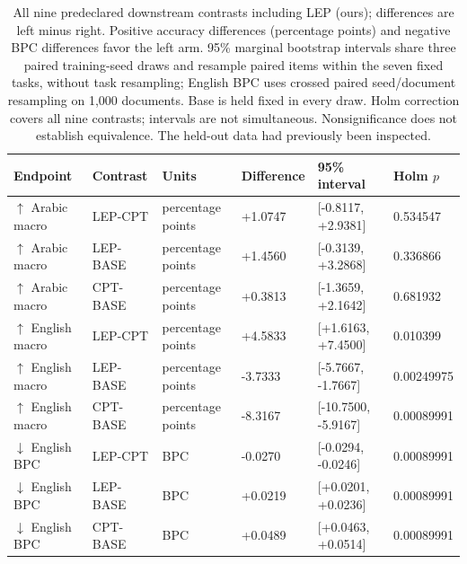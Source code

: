 \begin{table}[t]
\centering
\small
\setlength{\tabcolsep}{4pt}
\begin{tabular}{@{}llllll@{}}
\toprule
Endpoint & Contrast & Units & Difference & 95\% interval & Holm $p$ \\
\midrule
$\uparrow$ Arabic macro & LEP-CPT & percentage points & +1.0747 & [-0.8117, +2.9381] & 0.534547 \\
$\uparrow$ Arabic macro & LEP-BASE & percentage points & +1.4560 & [-0.3139, +3.2868] & 0.336866 \\
$\uparrow$ Arabic macro & CPT-BASE & percentage points & +0.3813 & [-1.3659, +2.1642] & 0.681932 \\
$\uparrow$ English macro & LEP-CPT & percentage points & +4.5833 & [+1.6163, +7.4500] & 0.010399 \\
$\uparrow$ English macro & LEP-BASE & percentage points & -3.7333 & [-5.7667, -1.7667] & 0.00249975 \\
$\uparrow$ English macro & CPT-BASE & percentage points & -8.3167 & [-10.7500, -5.9167] & 0.00089991 \\
$\downarrow$ English BPC & LEP-CPT & BPC & -0.0270 & [-0.0294, -0.0246] & 0.00089991 \\
$\downarrow$ English BPC & LEP-BASE & BPC & +0.0219 & [+0.0201, +0.0236] & 0.00089991 \\
$\downarrow$ English BPC & CPT-BASE & BPC & +0.0489 & [+0.0463, +0.0514] & 0.00089991 \\
\bottomrule
\end{tabular}
\caption{All nine predeclared downstream contrasts including LEP (ours); differences are left minus right. Positive accuracy differences (percentage points) and negative BPC differences favor the left arm. 95\% marginal bootstrap intervals share three paired training-seed draws and resample paired items within the seven fixed tasks, without task resampling; English BPC uses crossed paired seed/document resampling on 1,000 documents. Base is held fixed in every draw. Holm correction covers all nine contrasts; intervals are not simultaneous. Nonsignificance does not establish equivalence. The held-out data had previously been inspected. }
\label{tab:rebuttal-downstream-inference}
\end{table}
